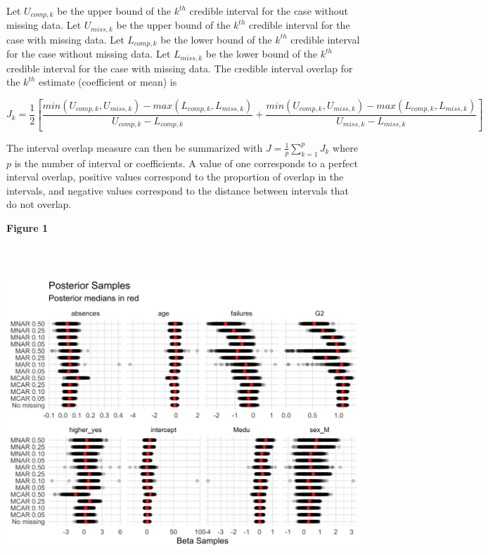 \documentclass[11pt]{article}
\begin{document}
Let $U_{comp,k}$ be the upper bound of the $k^{th}$ credible interval for the case without missing data. Let $U_{miss,k}$ be the upper bound of the $k^{th}$ credible interval for the case with missing data. Let $L_{comp,k}$ be the lower bound of the $k^{th}$ credible interval for the case without missing data. Let $L_{miss,k}$ be the lower bound of the $k^{th}$ credible interval for the case with missing data. The credible interval overlap for the $k^{th}$ estimate (coefficient or mean) is 

$$J_k = \frac{1}{2}\left[\frac{min(U_{comp,k}, U_{miss,k}) - max(L_{comp,k}, L_{miss,k})}{U_{comp,k} - L_{comp,k}} + \frac{min(U_{comp,k}, U_{miss,k}) - max(L_{comp,k}, L_{miss,k})}{U_{miss,k} - L_{miss,k}}\right]$$

The interval overlap measure can then be summarized with $J = \frac{1}{p}\sum_{k = 1}^pJ_k$ where $p$ is the number of interval or coefficients. A value of one corresponds to a perfect interval overlap, positive values correspond to the proportion of overlap in the intervals, and negative values correspond to the distance between intervals that do not overlap. 

\vspace{0.25in}

\newpage

\textbf{Figure 1}

\includegraphics[width=6.5in, height=5in]{posterior-samples-1}
\end{document}
